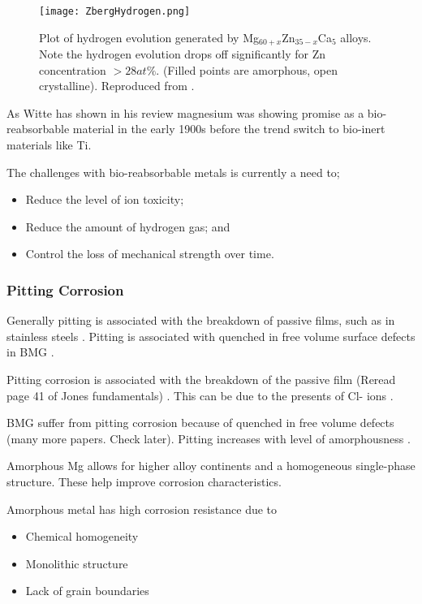 \documentclass[draft,a4paper,12pt,oneside]{report}%
\begin{document}
\begin{figure}[htbp]
	\centering
	\texttt{[image: ZbergHydrogen.png]}
	\caption[Hydrogen Evolution]{Plot of hydrogen evolution generated by Mg$_{60+x}$Zn$_{35-x}$Ca$_{5}$ alloys. Note the hydrogen evolution drops off significantly for Zn concentration $>28at\%$. (Filled points are amorphous, open crystalline). Reproduced from \cite{Zberg2009}.}
	\label{fig:ZbergHydrogen}
\end{figure}

As Witte \cite{Witte2010} has shown in his review magnesium was showing promise as a bio-reabsorbable material in the early 1900s before the trend switch to bio-inert materials like Ti. 

The challenges with bio-reabsorbable metals is currently a need to;

\begin{itemize}
	\item Reduce the level of ion toxicity;
	\item Reduce the amount of hydrogen gas; and
	\item Control the loss of mechanical strength over time. 
\end{itemize}

\subsubsection{Pitting Corrosion}
Generally pitting is associated with the breakdown of passive films, such as in stainless steels \cite{Zheng2014, Jones1992, Schweitzer2009}. Pitting is associated with quenched in free volume surface defects in BMG \cite{Wang2012}.  

Pitting corrosion is associated with the breakdown of the passive film (Reread page 41 of Jones fundamentals) \cite{Zheng2014, Jones1992, Schweitzer2009}. This can be due to the presents of Cl- ions \cite{Zheng2014}. 

BMG suffer from pitting corrosion because of quenched in free volume defects \cite{Wang2012} (many more papers. Check later). Pitting increases with level of amorphousness \cite{Schluter2012}. 

Amorphous Mg allows for higher alloy continents and a homogeneous single-phase structure.  These help improve corrosion characteristics. 

Amorphous metal has high corrosion resistance due to

\begin{itemize}
	\item Chemical homogeneity 
	\item Monolithic structure
	\item Lack of grain boundaries 
\end{itemize}
 
\end{document}
